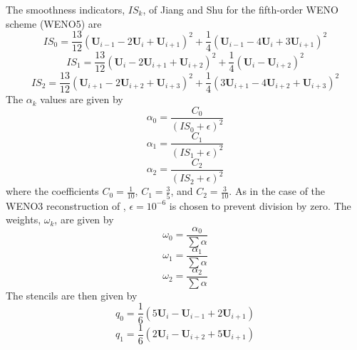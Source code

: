 The smoothness indicators, $IS_k$, of Jiang and Shu \cite{1996JCoPh.126..202J} for the fifth-order WENO scheme (WENO5) are
\begin{equation}
	IS_0 = \frac{13}{12}\left(\boldsymbol{U}_{i-1} -2 \boldsymbol{U}_i + \boldsymbol{U}_{i+1}\right)^2 + \frac{1}{4}\left(\boldsymbol{U}_{i-1} - 4 \boldsymbol{U}_i + 3 \boldsymbol{U}_{i+1}\right)^2
\end{equation}
\begin{equation}
	IS_1 = \frac{13}{12}\left(\boldsymbol{U}_{i} -2 \boldsymbol{U}_{i+1} + \boldsymbol{U}_{i+2}\right)^2 + \frac{1}{4}\left(\boldsymbol{U}_{i} -  \boldsymbol{U}_{i+2}\right)^2
\end{equation}
\begin{equation}
	IS_2 = \frac{13}{12}\left(\boldsymbol{U}_{i+1} -2 \boldsymbol{U}_{i+2} + \boldsymbol{U}_{i+3}\right)^2 + \frac{1}{4}\left(3 \boldsymbol{U}_{i+1} -4 \boldsymbol{U}_{i+2} +  \boldsymbol{U}_{i+3}\right)^2
\end{equation}
The $\alpha_k$ values are given by
\begin{equation}
	\alpha_0 = \frac{C_0}{\left(IS_0 + \epsilon\right)^2}
\end{equation}
\begin{equation}
	\alpha_1 = \frac{C_1}{\left(IS_1 + \epsilon\right)^2}
\end{equation}
\begin{equation}
	\alpha_2 = \frac{C_2}{\left(IS_2 + \epsilon\right)^2}
\end{equation}
where the coefficients $C_0 = \frac{1}{10}$, $C_1 = \frac{3}{5}$, and $C_2 = \frac{3}{10}$. As in the case of the WENO3 reconstruction of , $\epsilon = 10^{-6}$ is chosen to prevent division by zero. The weights, $\omega_k$, are given by
\begin{equation}
	\omega_0 = \frac{\alpha_0}{\sum \alpha}
\end{equation}
\begin{equation}
	\omega_1 = \frac{\alpha_1}{\sum \alpha}
\end{equation}
\begin{equation}
	\omega_2 = \frac{\alpha_2}{\sum \alpha}
\end{equation}
The stencils are then given by
\begin{equation}\label{eqn:q05}
	q_0 = \frac{1}{6}\left(5 \boldsymbol{U}_{i} - \boldsymbol{U}_{i-1} + 2 \boldsymbol{U}_{i+1} \right)
\end{equation}
\begin{equation}\label{eqn:q15}
	q_1 = \frac{1}{6} \left( 2 \boldsymbol{U}_{i} - \boldsymbol{U}_{i+2} + 5 \boldsymbol{U}_{i+1} \right)
\end{equation}
